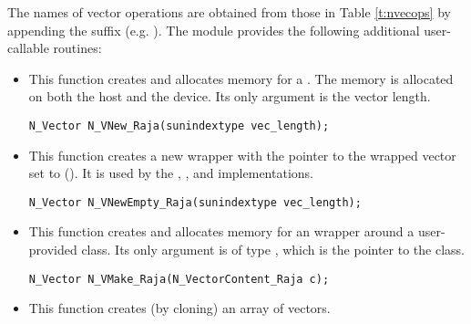 The names of vector operations are obtained from those in 
Table \ref{t:nvecops} by appending the suffix  (e.g. ).
The module {\nvecraja}  provides the following additional user-callable routines:
\begin{itemize}

  

\item {}
 
  This function creates and allocates memory for a {\raja} .
  The memory is allocated on both the host and the device. Its only argument is the 
  vector length. 

\begin{verbatim}
N_Vector N_VNew_Raja(sunindextype vec_length);
\end{verbatim}

  

\item {}
 
  This function creates a new {\nvector} wrapper with the pointer to
  the wrapped {\raja} vector set to (). It is used by the 
  , , and  
  implementations. 

\begin{verbatim}
N_Vector N_VNewEmpty_Raja(sunindextype vec_length);
\end{verbatim}

  

\item {}
  
  This function creates and allocates memory for an {\nvecraja}
  wrapper around a user-provided  class. 
  Its only argument is of type , which
  is the pointer to the class.

\begin{verbatim}
N_Vector N_VMake_Raja(N_VectorContent_Raja c);
\end{verbatim}



\item {}
 
  This function creates (by cloning) an array of  {\nvecraja} vectors.
 

\end{itemize}
